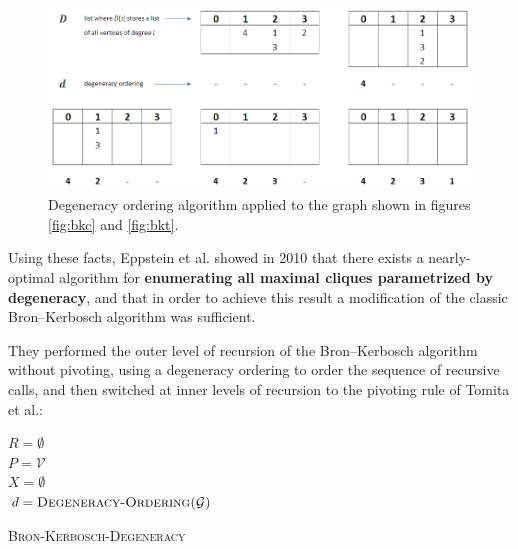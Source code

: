 \documentclass[11pt]{article}
\begin{document}
\begin{figure}[h]
\centering
\includegraphics[width=1\textwidth]{img/ex_deg_order.png}
\caption{Degeneracy ordering algorithm applied to the graph shown in
figures \ref{fig:bkc} and \ref{fig:bkt}.}
\label{fig:deg}
\end{figure}

Using these facts, Eppstein et al.\cite{bk_deg} showed in 2010 that there exists a nearly-optimal algorithm for
\textbf{enumerating all maximal cliques parametrized by degeneracy}, and that in order to achieve this result a modification of the classic
Bron--Kerbosch algorithm was sufficient.

They performed the outer level of recursion of the Bron--Kerbosch
algorithm without pivoting, using a degeneracy ordering to order the
sequence of recursive calls, and then switched at inner levels of
recursion to the pivoting rule of Tomita et
al.\cite{bk_tomita}:

\begin{algorithm}[H]
\DontPrintSemicolon
\SetAlgoLined

  
  \BlankLine
  \BlankLine
  
  $R = \emptyset$\\
  $P = \mathcal{V}$\\
  $X = \emptyset$\\
  $d = \textsc{Degeneracy-Ordering(}\mathcal{G}\textsc{)}$\\
  
  \BlankLine
  
  
\caption{\textsc{Bron-Kerbosch-Degeneracy}}
\end{algorithm}
\end{document}

